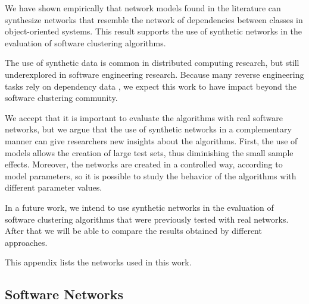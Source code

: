 We have shown empirically that network models found in the literature can
synthesize networks that resemble the network of dependencies between classes in
object-oriented systems. This result supports the use of synthetic networks in
the evaluation of software clustering algorithms.

The use of synthetic data is common in distributed computing research, but still
underexplored in software engineering research. Because many reverse engineering
tasks rely on dependency data \cite{Tonella2007}, we expect this work to have
impact beyond the software clustering community.


We accept that it is important to evaluate the algorithms with real software
networks, but we argue that the use of synthetic networks in a complementary
manner can give researchers new insights about the algorithms. First, the use of
models allows the creation of large test sets, thus diminishing the small sample
effects. Moreover, the networks are created in a controlled way, according to
model parameters, so it is possible to study the behavior of the algorithms with
different parameter values.

In a future work, we intend to use synthetic networks in the evaluation of
software clustering algorithms that were previously tested with real networks.
After that we will be able to compare the results obtained by different
approaches.

\appendix %

This appendix lists the networks used in this work.

\subsection{Software Networks}

